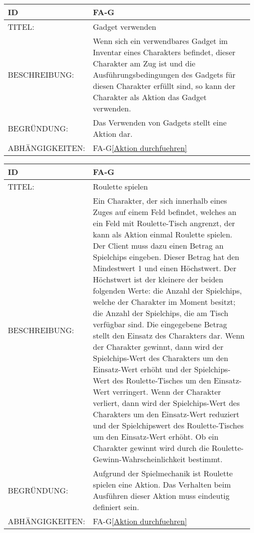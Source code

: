 \begin{tabularx}{16cm}{l|X}
	{table}\label{Gadget verwenden}
	\textbf{ID} & \textbf{FA-G\arabic{table}} \\
	\hline
	TITEL: & Gadget verwenden \\
	\hline
	BESCHREIBUNG: & Wenn sich ein verwendbares Gadget im Inventar eines Charakters befindet, dieser Charakter am Zug ist und die Ausführungsbedingungen des Gadgets für diesen Charakter erfüllt sind, so kann der Charakter als Aktion das Gadget verwenden. \\
	 
	\hline
	BEGRÜNDUNG: & Das Verwenden von Gadgets stellt eine Aktion dar.\\
	\hline
	ABHÄNGIGKEITEN: & FA-G\ref{Aktion durchfuehren}  \todo[inline]{2.8.1 Wahlphase}\\
\end{tabularx}

\begin{tabularx}{16cm}{l|X}
	{table}\label{Roulette spielen}
	\textbf{ID} & \textbf{FA-G\arabic{table}} \\
	\hline
	TITEL: & Roulette spielen \\
	\hline
	BESCHREIBUNG: & Ein Charakter, der sich innerhalb eines Zuges auf einem Feld befindet, welches an ein Feld mit Roulette-Tisch angrenzt, der kann als Aktion einmal Roulette spielen. Der Client muss dazu einen Betrag an Spielchips eingeben. Dieser Betrag hat den Mindestwert 1 und einen Höchstwert. Der Höchstwert ist der kleinere der beiden folgenden Werte: die Anzahl der Spielchips, welche der Charakter im Moment besitzt; die Anzahl der Spielchips, die am Tisch verfügbar sind. Die eingegebene Betrag stellt den Einsatz des Charakters dar. Wenn der Charakter gewinnt, dann wird der Spielchips-Wert des Charakters um den Einsatz-Wert erhöht und der Spielchips-Wert des Roulette-Tisches um den Einsatz-Wert verringert. Wenn der Charakter verliert, dann wird der Spielchips-Wert des Charakters um den Einsatz-Wert reduziert und der Spielchipswert des Roulette-Tisches um den Einsatz-Wert erhöht. Ob ein Charakter gewinnt wird durch die Roulette-Gewinn-Wahrscheinlichkeit bestimmt.\\
	 
	\hline
	BEGRÜNDUNG: & Aufgrund der Spielmechanik ist Roulette spielen eine Aktion. Das Verhalten beim Ausführen dieser Aktion muss eindeutig definiert sein.\\
	\hline
	ABHÄNGIGKEITEN: & FA-G\ref{Aktion durchfuehren} \todo[inline]{2.8.1 Wahlphase}\\
\end{tabularx}


